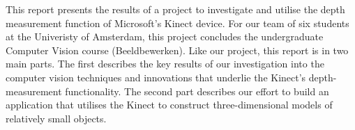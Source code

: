 This report presents the results of a project to investigate and utilise the
depth measurement function of Microsoft's Kinect device. For our team of six
students at the Univeristy of Amsterdam, this project concludes the
undergraduate Computer Vision course (Beeldbewerken). Like our project, this
report is in two main parts.  The first describes the key results of our
investigation into the computer vision techniques and innovations that underlie
the Kinect's depth-measurement functionality. The second part describes our
effort to build an application that utilises the Kinect to construct
three-dimensional models of relatively small objects. 
